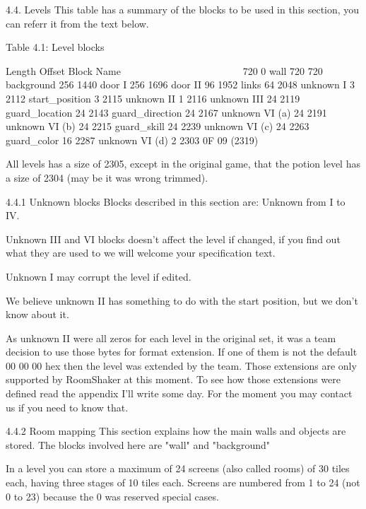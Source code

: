 4.4. Levels
 This table has a summary of the blocks to be used in this section,
 you can referr it from the text below.

                   Table 4.1: Level blocks
                   ~~~~~~~~~~~~~~~~~~~~~~~

  Length Offset  Block Name
  ~~~~~~ ~~~~~~  ~~~~~~~~~~
  720    0       wall
  720    720     background
  256    1440    door I
  256    1696    door II
  96     1952    links
  64     2048    unknown I
  3      2112    start_position
  3      2115    unknown II
  1      2116    unknown III
  24     2119    guard_location
  24     2143    guard_direction
  24     2167    unknown VI (a)
  24     2191    unknown VI (b)
  24     2215    guard_skill
  24     2239    unknown VI (c)
  24     2263    guard_color
  16     2287    unknown VI (d)
  2      2303    0F 09 (2319)

 All levels has a size of 2305, except in the original game, that the
 potion level has a size of 2304 (may be it was wrong trimmed).

4.4.1 Unknown blocks
 Blocks described in this section are: Unknown from I to IV.

 Unknown III and VI blocks doesn't affect the level if changed, if you find
 out what they are used to we will welcome your specification text.

 Unknown I may corrupt the level if edited.

 We believe unknown II has something to do with the start position, but we
 don't know about it.

 As unknown II were all zeros for each level in the original set, it was a
 team decision to use those bytes for format extension. If one of them is
 not the default 00 00 00 hex then the level was extended by the team.
 Those extensions are only supported by RoomShaker at this  moment. To see
 how those extensions were defined read the appendix I'll write some day.
 For the moment you may contact us if you need to know that.

4.4.2 Room mapping
 This section explains how the main walls and objects are stored. The
 blocks involved here are "wall" and "background"

 In a level you can store a maximum of 24 screens (also called rooms) of 30
 tiles each, having three stages of 10 tiles each. Screens are numbered
 from 1 to 24 (not 0 to 23) because the 0 was reserved special cases.

